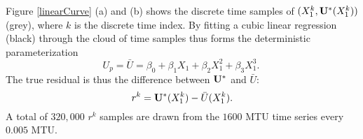		Figure {\ref{linearCurve}} (a) and (b) shows the discrete time samples of $(X_1^k, \bold{U^*}(X_1^k))$ (grey),
		where $k$ is the discrete time index.
		By fitting a cubic linear regression (black) through the cloud of time samples
		thus forms the deterministic parameterization
		\begin{equation}
			U_p = \bar{U} = \beta_0 + \beta_1 X_1 + \beta_2 X_1^2 + \beta_3 X_1^3.\
		\end{equation}
		The true residual is thus the difference between $\bold{U^*}$ and $\bar{U}$: 
		\begin{equation} \label{true_U}
			 r^k = \bold{U^*}(X_1^k) - \bar{U}(X_1^k).
		\end{equation}
		A total of $320,000$ $r^k$ samples are drawn from the $1600$ MTU time series every 
		$0.005$ MTU.\
		
		

